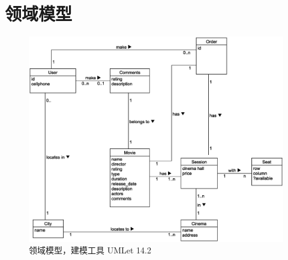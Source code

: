 \documentclass[a4paper]{article}
\begin{document}
  \section{领域模型}
  \begin{figure}[H]
    \centering
    \includegraphics[width=\textwidth]{domain_model.eps}
    \caption{领域模型，建模工具  UMLet 14.2}
  \end{figure}
\end{document}
